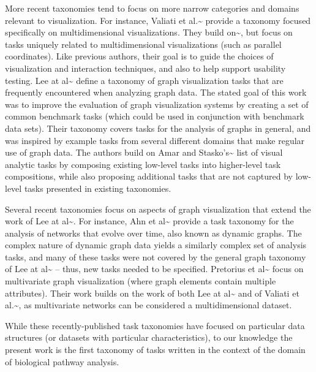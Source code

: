 More recent taxonomies tend to focus on more narrow categories and domains relevant to visualization.
For instance, Valiati et al.\textasciitilde{}\cite{Valiati2006} provide a taxonomy focused specifically on multidimensional visualizations.
They build on\textasciitilde{}\cite{Wehrend1990}, but focus on tasks uniquely related to multidimensional visualizations (such as parallel coordinates).
Like previous authors, their goal is to guide the choices of visualization and interaction techniques, and also to help support usability testing.
Lee at al\textasciitilde{}\cite{Lee2006} define a taxonomy of graph visualization tasks that are frequently encountered when analyzing graph data.
The stated goal of this work was to improve the evaluation of graph visualization systems by creating a set of common benchmark tasks (which could be used in conjunction with benchmark data sets).
Their taxonomy covers tasks for the analysis of graphs in general, and was inspired by example tasks from several different domains that make regular use of graph data.
The authors build on Amar and Stasko's\textasciitilde{}\cite{Amar2005} list of visual analytic tasks by composing existing low-level tasks into higher-level task compositions, while also proposing additional tasks that are not captured by low-level tasks presented in existing taxonomies.

Several recent taxonomies focus on aspects of graph visualization that extend the work of Lee at al\textasciitilde{}\cite{Lee2006}.
For instance, Ahn et al\textasciitilde{}\cite{Ahn2014} provide a task taxonomy for the analysis of networks that evolve over time, also known as dynamic graphs.
The complex nature of dynamic graph data yields a similarly complex set of analysis tasks, and many of these tasks were not covered by the general graph taxonomy of Lee at al\textasciitilde{}\cite{Lee2006} -- thus, new tasks needed to be specified.
Pretorius et al\textasciitilde{}\cite{Pretorius2014} focus on multivariate graph visualization (where graph elements contain multiple attributes).
Their work builds on the work of both Lee at al\textasciitilde{}\cite{Lee2006} and of Valiati et al.\textasciitilde{}\cite{Valiati2006}, as multivariate networks can be considered a multidimensional dataset.

While these recently-published task taxonomies have focused on particular data structures (or datasets with particular characteristics), to our knowledge the present work is the first taxonomy of tasks written in the context of the domain of biological pathway analysis.

